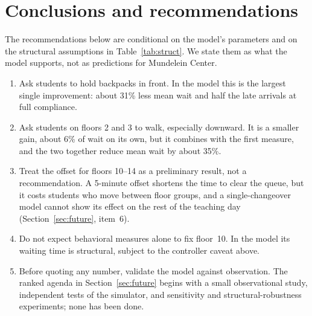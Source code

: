 \section{Conclusions and recommendations}

The recommendations below are conditional on the model's parameters and on the structural assumptions in
Table~\ref{tab:struct}. We state them as what the model supports, not as predictions for Mundelein Center.

\begin{enumerate}
\item Ask students to hold backpacks in front. In the model this is the largest single improvement: about
31\% less mean wait and half the late arrivals at full compliance.
\item Ask students on floors 2 and 3 to walk, especially downward. It is a smaller gain, about 6\% of wait on its
own, but it combines with the first measure, and the two together reduce mean wait by about 35\%.
\item Treat the offset for floors 10--14 as a preliminary result, not a recommendation. A 5-minute offset shortens
the time to clear the queue, but it costs students who move between floor groups, and a single-changeover model
cannot show its effect on the rest of the teaching day (Section~\ref{sec:future}, item~6).
\item Do not expect behavioral measures alone to fix floor~10. In the model its waiting time is structural, subject
to the controller caveat above.
\item Before quoting any number, validate the model against observation. The ranked agenda in
Section~\ref{sec:future} begins with a small observational study, independent tests of the simulator, and
sensitivity and structural-robustness experiments; none has been done.
\end{enumerate}
